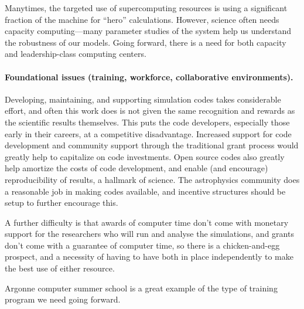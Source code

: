 \documentclass[11pt]{article}
\begin{document}
Manytimes, the targeted use of supercomputing resources is using a
significant fraction of the machine for ``hero'' calculations.
However, science often needs capacity computing---many parameter
studies of the system help us understand the robustness of our models.
Going forward, there is a need for both capacity and leadership-class
computing centers.


\paragraph*{Foundational issues (training, workforce, collaborative environments).}

Developing, maintaining, and supporting simulation codes takes
considerable effort, and often this work does is not given the same
recognition and rewards as the scientific results themselves.  This
puts the code developers, especially those early in their careers, at
a competitive disadvantage. Increased support for code development and
community support through the traditional grant process would greatly
help to capitalize on code investments.  Open source codes also greatly
help amortize the costs of code development, and enable (and
encourage) reproducibility of results, a hallmark of science.  The
astrophysics community does a reasonable job in making codes available, and
incentive structures should be setup to further encourage this.

A further difficulty is that awards of computer time don't come with
monetary support for the researchers who will run and analyse the
simulations, and grants don't come with a guarantee of computer time,
so there is a chicken-and-egg prospect, and a necessity of having to
have both in place independently to make the best use of either
resource.

Argonne computer summer school is a great example of the type of training program we
need going forward.
\end{document}
